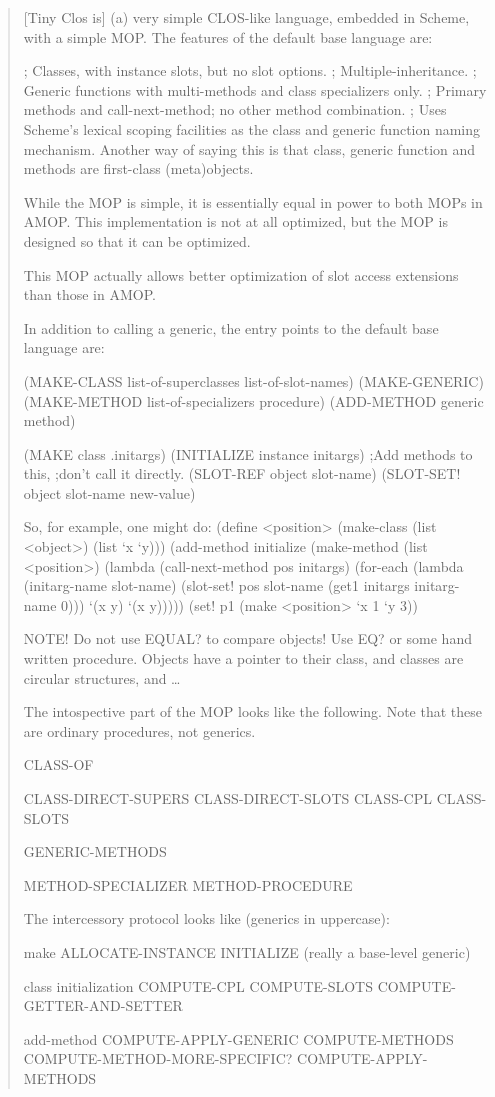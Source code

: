 \documentclass[11pt]{article}
\begin{document}
\begin{quote}
[Tiny Clos is] (a) very simple CLOS-like language,
embedded in Scheme, with a simple MOP. The features
of the default base language are:

; Classes, with instance slots, but no slot options.
; Multiple-inheritance.
; Generic functions with multi-methods and class specializers only.
; Primary methods and call-next-method; no other method combination.
; Uses Scheme's lexical scoping facilities as the class and generic
  function naming mechanism. Another way of saying this is that
  class, generic function and methods are first-class (meta)objects.

While the MOP is simple, it is essentially equal in power to both MOPs
in AMOP. This implementation is not at all optimized, but the MOP is
designed so that it can be optimized.

This MOP actually allows better optimization of slot access extensions
than those in AMOP.

In addition to calling a generic, the entry points to the default base
language are:
  
  (MAKE-CLASS list-of-superclasses list-of-slot-names)
  (MAKE-GENERIC)
  (MAKE-METHOD list-of-specializers procedure)
  (ADD-METHOD generic method)
  
  (MAKE class .initargs)
  (INITIALIZE instance initargs)      ;Add methods to this, 
                                      ;don't call it directly.
  (SLOT-REF   object slot-name)
  (SLOT-SET!  object slot-name new-value)

So, for example, one might do:
(define <position> (make-class (list <object>) (list `x `y)))
(add-method initialize
     (make-method (list <position>)
       (lambda (call-next-method pos initargs)
         (for-each (lambda (initarg-name slot-name)
                     (slot-set! pos
                                slot-name
                                (get1 initargs initarg-name 0)))
                   `(x y)
                   `(x y)))))
(set! p1 (make <position> `x 1 `y 3))

NOTE! Do not use EQUAL? to compare objects! Use EQ? or some hand
      written procedure. Objects have a pointer to their class,
      and classes are circular structures, and \ldots{}

The intospective part of the MOP looks like the following. Note that
these are ordinary procedures, not generics.

CLASS-OF

CLASS-DIRECT-SUPERS
CLASS-DIRECT-SLOTS
CLASS-CPL
CLASS-SLOTS

GENERIC-METHODS

METHOD-SPECIALIZER
METHOD-PROCEDURE

The intercessory protocol looks like (generics in uppercase):

make
  ALLOCATE-INSTANCE
  INITIALIZE              (really a base-level generic)

class initialization
  COMPUTE-CPL
  COMPUTE-SLOTS
  COMPUTE-GETTER-AND-SETTER

add-method
  COMPUTE-APPLY-GENERIC
    COMPUTE-METHODS
      COMPUTE-METHOD-MORE-SPECIFIC?
    COMPUTE-APPLY-METHODS
\end{quote}
\end{document}
